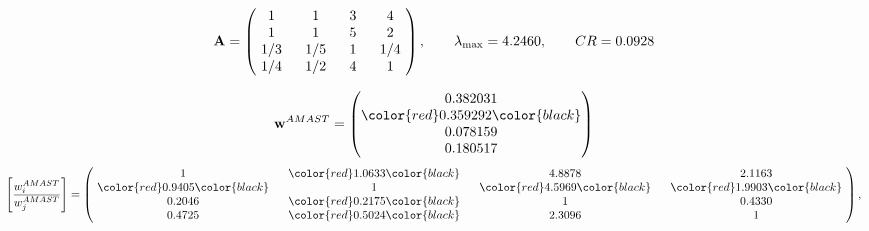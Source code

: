 \begin{example}
\begin{equation*}
\mathbf{A} =
\begin{pmatrix}
$\,\,$ 1 $\,\,$ & $\,\,$1$\,\,$ & $\,\,$3$\,\,$ & $\,\,$4 $\,\,$ \\
$\,\,$ 1 $\,\,$ & $\,\,$ 1 $\,\,$ & $\,\,$5$\,\,$ & $\,\,$2 $\,\,$ \\
$\,\,$ 1/3$\,\,$ & $\,\,$ 1/5$\,\,$ & $\,\,$ 1 $\,\,$ & $\,\,$ 1/4 $\,\,$ \\
$\,\,$ 1/4$\,\,$ & $\,\,$ 1/2$\,\,$ & $\,\,$4$\,\,$ & $\,\,$ 1  $\,\,$ \\
\end{pmatrix},
\qquad
\lambda_{\max} =
4.2460,
\qquad
CR = 0.0928
\end{equation*}

\begin{equation*}
\mathbf{w}^{AMAST} =
\begin{pmatrix}
0.382031\\
\color{red} 0.359292\color{black} \\
0.078159\\
0.180517
\end{pmatrix}\end{equation*}
\begin{equation*}
\left[ \frac{{w}^{AMAST}_i}{{w}^{AMAST}_j} \right] =
\begin{pmatrix}
$\,\,$ 1 $\,\,$ & $\,\,$\color{red} 1.0633\color{black} $\,\,$ & $\,\,$4.8878$\,\,$ & $\,\,$2.1163$\,\,$ \\
$\,\,$\color{red} 0.9405\color{black} $\,\,$ & $\,\,$ 1 $\,\,$ & $\,\,$\color{red} 4.5969\color{black} $\,\,$ & $\,\,$\color{red} 1.9903\color{black}   $\,\,$ \\
$\,\,$0.2046$\,\,$ & $\,\,$\color{red} 0.2175\color{black} $\,\,$ & $\,\,$ 1 $\,\,$ & $\,\,$0.4330 $\,\,$ \\
$\,\,$0.4725$\,\,$ & $\,\,$\color{red} 0.5024\color{black} $\,\,$ & $\,\,$2.3096$\,\,$ & $\,\,$ 1  $\,\,$ \\
\end{pmatrix},
\end{equation*}


\end{example}
